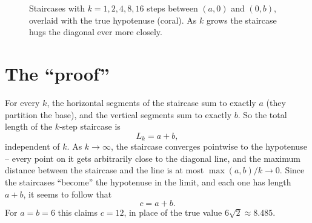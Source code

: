 \documentclass[11pt]{article}
\newcommand{\staircase}[2]{%
  \pgfmathtruncatemacro{\kmax}{#1-1}
  \foreach \i in {0,...,\kmax} {
    \pgfmathsetmacro{\xa}{6*(1-\i/#1)}
    \pgfmathsetmacro{\ya}{6*\i/#1}
    \pgfmathsetmacro{\xb}{6*(1-(\i+1)/#1)}
    \pgfmathsetmacro{\yb}{6*(\i+1)/#1}
    \draw[#2, line width=0.9pt] (\xa,\ya) -- (\xb,\ya) -- (\xb,\yb);
  }
}
\begin{document}
\begin{figure}[h]
\centering
{}
\caption{Staircases with $k=1,2,4,8,16$ steps between $(a,0)$ and $(0,b)$,
overlaid with the true hypotenuse (coral). As $k$ grows the staircase hugs
the diagonal ever more closely.}
\label{fig:stairs}
\end{figure}

\section{The ``proof''}

For every $k$, the horizontal segments of the staircase sum to exactly $a$
(they partition the base), and the vertical segments sum to exactly $b$.
So the total length of the $k$-step staircase is
$$L_k = a + b,$$
independent of $k$. As $k\to\infty$, the staircase converges pointwise to the
hypotenuse -- every point on it gets arbitrarily close to the diagonal line,
and the maximum distance between the staircase and the line is at most
$\max(a,b)/k \to 0$. Since the staircases ``become'' the hypotenuse in the
limit, and each one has length $a+b$, it seems to follow that
$$c = a+b.$$
For $a=b=6$ this claims $c=12$, in place of the true value $6\sqrt2\approx
8.485$.
\end{document}

